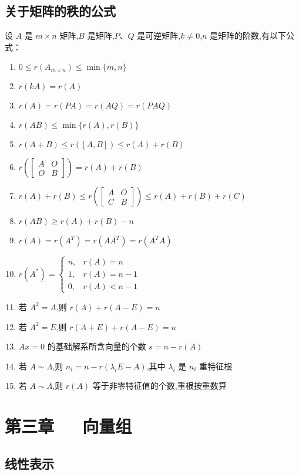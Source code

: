 \documentclass[UTF8]{ctexart}
\theoremstyle{remark}
\begin{document}
	\subsection{关于矩阵的秩的公式}
	设 \(A\) 是 \(m\times n\) 矩阵,\(B\) 是矩阵,\(P\)、\(Q\) 是可逆矩阵,\(k\neq0\),\(n\) 是矩阵的阶数,有以下公式：
	\begin{enumerate}
		\item \(0\leq r(A_{m\times n})\leq\min\{m,n\}\)
		\item \(r(kA) = r(A)\)
		\item \(r(A) = r(PA) = r(AQ) = r(PAQ)\)
		\item \(r(AB)\leq\min\{r(A),r(B)\}\)
		\item \(r(A + B)\leq r([A,B])\leq r(A)+r(B)\)
		\item \(r\left(\begin{bmatrix}A & O\\O & B\end{bmatrix}\right)=r(A)+r(B)\)
		\item \(r(A)+r(B)\leq r\left(\begin{bmatrix}A & O\\C & B\end{bmatrix}\right)\leq r(A)+r(B)+r(C)\)
		\item \(r(AB)\geq r(A)+r(B)-n\)
		\item \(r(A)=r(A^T)=r(AA^T)=r(A^TA)\)
		\item \(r(A^*) = 
		\begin{cases}
			n, & r(A)=n\\
			1, & r(A)=n - 1\\
			0, & r(A)<n - 1
		\end{cases}\)
		\item 若 \(A^2 = A\),则 \(r(A)+r(A - E)=n\)
		\item 若 \(A^2 = E\),则 \(r(A + E)+r(A - E)=n\)
		\item \(Ax = 0\) 的基础解系所含向量的个数 \(s=n - r(A)\)
		\item 若 \(A\sim\Lambda\),则 \(n_i=n - r(\lambda_i E - A)\),其中 \(\lambda_i\) 是 \(n_i\) 重特征根
		\item 若 \(A\sim\Lambda\),则 \(r(A)\) 等于非零特征值的个数,重根按重数算
	\end{enumerate}
	
	\section{第三章~~~向量组}
	\subsection{线性表示}
\end{document}

